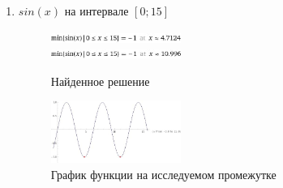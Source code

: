 \documentclass[12pt]{article}
\begin{document}
\begin{enumerate}
\newpage
\item $sin(x)$ на интервале $[0; 15]$

\begin{figure}[h]
\centering
\includegraphics[width=0.4\textwidth]{images/3loc1.jpg} \\
\includegraphics[width=0.4\textwidth]{images/3loc2.jpg}
\caption{Найденное решение}
\end{figure}

\begin{figure}[h]
\centering
\includegraphics[width=0.4\textwidth]{images/3loc3.jpg}
\caption{График функции на исследуемом промежутке}
\end{figure}


\end{enumerate}
\end{document}
